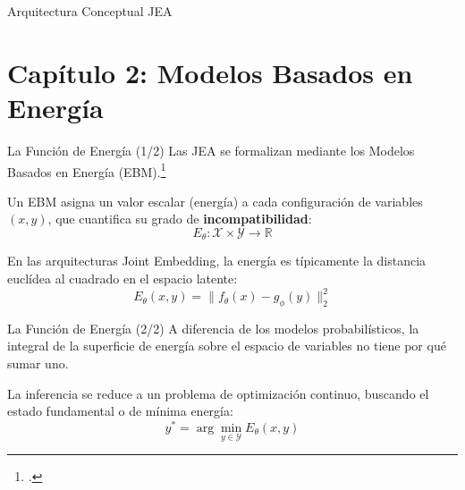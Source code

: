 \documentclass[aspectratio=169, 12pt]{beamer}
\begin{document}
\begin{frame}{Arquitectura Conceptual JEA}
\centering
{}
\end{frame}

\section{Capítulo 2: Modelos Basados en Energía}

\begin{frame}{La Función de Energía (1/2)}
Las JEA se formalizan mediante los Modelos Basados en Energía (EBM).\footcite{lecun2006tutorial}

Un EBM asigna un valor escalar (energía) a cada configuración de variables $(x, y)$, que cuantifica su grado de \textbf{incompatibilidad}:
\[
    E_\theta : \mathcal{X} \times \mathcal{Y} \to \mathbb{R}
\]

En las arquitecturas Joint Embedding, la energía es típicamente la distancia euclídea al cuadrado en el espacio latente:
\[
    E_\theta(x, y) = \|f_\theta(x) - g_\phi(y)\|_2^2
\]
\end{frame}

\begin{frame}{La Función de Energía (2/2)}
A diferencia de los modelos probabilísticos, la integral de la superficie de energía sobre el espacio de variables no tiene por qué sumar uno.

La inferencia se reduce a un problema de optimización continuo, buscando el estado fundamental o de mínima energía:
\[
    y^* = \arg\min_{y \in \mathcal{Y}} E_\theta(x, y)
\]
\end{frame}
\end{document}
